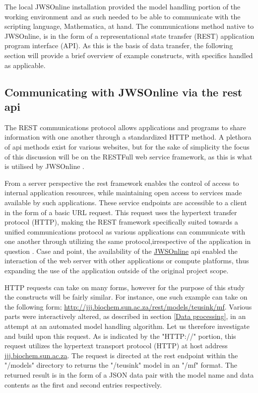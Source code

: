 The local JWSOnline installation provided the model handling portion of the working environment and as such needed to be able to communicate with the scripting language, Mathematica, at hand. The communications method native to JWSOnline, is in the form of a representational state transfer (REST) application program interface (API). As this is the basis of data transfer, the following section will provide a brief overview of example constructs, with specifics handled as applicable. 

\subsection{Communicating with JWSOnline via the \gls{rest} \gls{api}} \label{REST Communication}

The REST communications protocol allows applications and programs to share information with one another through a standardized HTTP method. A plethora of \gls{api} methods exist for various websites, but for the sake of simplicity the focus of this discussion will be on the RESTFull web service framework, as this is what is utilised by JWSOnline \cite{rest2018}.

From a server perspective the \gls{rest} framework enables the control of access to internal application resources, while maintaining open access to services made available by such applications. These service endpoints are accessible to a client in the form of a basic URL request. This request uses the hypertext transfer protocol (HTTP), making the REST framework specifically suited towards a unified communications protocol as various applications can communicate with one another through utilizing the same protocol,irrespective of the application in question \cite{rest2018}. Case and point, the availability of the \href{http://jjj.biochem.sun.ac.za}{JWSOnline} \gls{api} enabled the interaction of the web server with other applications or compute platforms, thus expanding the use of the application outside of the original project scope. 

HTTP requests can take on many forms, however for the purpose of this study the constructs will be fairly similar. For instance, one such example can take on the following form; \href{http://jjj.biochem.sun.ac.za/rest/models/teusink/mf}{http://jjj.biochem.sun.ac.za/rest/models/teusink/mf}. Various parts were interactively altered, as described in section \ref{Data processing}, in an attempt at an automated model handling algorithm. Let us therefore investigate and build upon this request. As is indicated by the "HTTP://" portion, this request utilizes the hypertext transport protocol (HTTP) at host address \href{jjj.biochem.sun.ac.za}{jjj.biochem.sun.ac.za}. The request is directed at the \gls{rest} endpoint within the "/models" directory to returns the "/teusink" model in an "/mf" format. The returned result is in the form of a JSON data pair with the model name and data contents as the first and second entries respectively.

